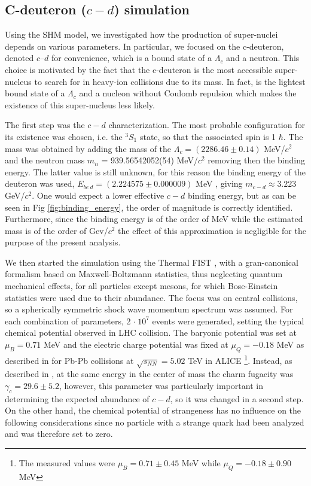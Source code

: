 \documentclass[12pt,a4paper]{book}
\begin{document}
	
	\FloatBarrier
	\subsection{C-deuteron ($c-d$) simulation}
	
	Using the SHM model, we investigated how the production of super-nuclei depends on various parameters. In particular, we focused on the c-deuteron, denoted $c–d$ for convenience, which is a bound state of a $\Lambda_c$ and a neutron. This choice is motivated by the fact that the c-deuteron is the most accessible super-nucleus to search for in heavy-ion collisions due to its mass. In fact, is the lightest bound state of a $\Lambda_c$ and a nucleon without Coulomb repulsion which makes the existence of this super-nucleus less likely. 
	
	The first step was the $c-d$ characterization. The most probable configuration for its existence was chosen, i.e. the $^{3}S_1$ state, so that the associated spin is 1 $\hbar$. The mass was obtained by adding the mass of the $\Lambda_c = (2286.46 \pm 0.14)$ MeV/$c^2$ and the neutron mass $m_n$ = 939.56542052(54) MeV/$c^2$ \cite{ParticleDataGroup:2024cfk} removing then the binding energy. The latter value is still unknown, for this reason the binding energy of the deuteron was used, $E_{be\ d} = (2.224575 \pm 0.000009)$ MeV \cite{VANDERLEUN1982261}, giving $m_{c-d} \approx 3.223$ GeV/$c^2$. One would expect a lower effective $c-d$ binding energy, but as can be seen in Fig \ref{fig:binding_energy}, the order of magnitude is correctly identified. Furthermore, since the binding energy is of the order of MeV while the estimated mass is of the order of Gev/$c^2$ the effect of this approximation is negligible for the purpose of the present analysis.
	
	We then started the simulation using the Thermal FIST \cite{Vovchenko_2019}, with a gran-canonical formalism based on Maxwell-Boltzmann statistics, thus neglecting quantum mechanical effects, for all particles except mesons, for which Bose-Einstein statistics were used due to their abundance. The focus was on central collisions, so a spherically symmetric shock wave momentum spectrum was assumed. For each combination of parameters, 2 $\cdot \ 10^7$ events were generated, setting the typical chemical potential observed in LHC collision. The baryonic potential was set at $\mu_B=0.71$ MeV and the electric charge potential was fixed at $\mu_Q= -0.18$ MeV as described in \cite{Acharya_2024} for Pb-Pb collisions at $\sqrt{s_{NN}}= 5.02$ TeV in ALICE \footnote{The measured values were $\mu_B=0.71 \pm 0.45$ MeV while $\mu_Q=-0.18 \pm 0.90$ MeV}. Instead, as described in \cite{charm_hierarchy_in_the_statistical_hadronization_model}, at the same energy in the center of mass the charm fugacity was $\gamma_c = 29.6 \pm 5.2$, however, this parameter was particularly important in determining the expected abundance of $c-d$, so it was changed in a second step. On the other hand, the chemical potential of strangeness has no influence on the following considerations since no particle with a strange quark had been analyzed and was therefore set to zero. 
	
\end{document}
